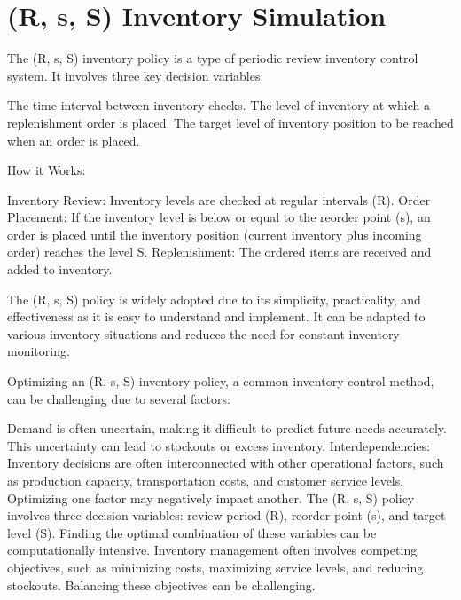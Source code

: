 \documentclass[letterpaper,10pt,english]{jupyterBook}
\begin{document}
\chapter{(R, s, S) Inventory Simulation}
\label{\detokenize{docs/Ex_Lecture_Demo_Inventory_Sim:r-s-s-inventory-simulation}}\label{\detokenize{docs/Ex_Lecture_Demo_Inventory_Sim::doc}}
\sphinxAtStartPar
The (R, s, S) inventory policy is a type of periodic review inventory control system. It involves three key decision variables:

\sphinxAtStartPar
{} The time interval between inventory checks.
 The level of inventory at which a replenishment order is placed.
 The target level of inventory position to be reached when an order is placed.

\sphinxAtStartPar
How it Works:

\sphinxAtStartPar
Inventory Review: Inventory levels are checked at regular intervals (R).
Order Placement: If the inventory level is below or equal to the reorder point (s), an order is placed until the inventory position (current inventory plus incoming order) reaches the level S.
Replenishment: The ordered items are received and added to inventory.

\sphinxAtStartPar
The (R, s, S) policy is widely adopted due to its simplicity, practicality, and effectiveness as it is easy to understand and implement. It can be adapted to various inventory situations and reduces the need for constant inventory monitoring.

\sphinxAtStartPar
Optimizing an (R, s, S) inventory policy, a common inventory control method, can be challenging due to several factors:

\sphinxAtStartPar
{} Demand is often uncertain, making it difficult to predict future needs accurately. This uncertainty can lead to stockouts or excess inventory.
Interdependencies: Inventory decisions are often interconnected with other operational factors, such as production capacity, transportation costs, and customer service levels. Optimizing one factor may negatively impact another.
 The (R, s, S) policy involves three decision variables: review period (R), reorder point (s), and target level (S). Finding the optimal combination of these variables can be computationally intensive.
 Inventory management often involves competing objectives, such as minimizing costs, maximizing service levels, and reducing stockouts. Balancing these objectives can be challenging.
\end{document}
